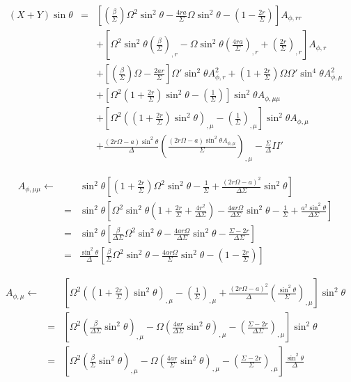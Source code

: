 \documentclass[aps,prd,preprint,groupedaddress]{revtex4-1}
\def\nn{\nonumber}
\def\beqn{\begin{eqnarray}}
\def\eeqn{\end{eqnarray}}
\def\st{\sin\theta}
\def\sst{\sin^2\theta}
\def\Ar{A_{\phi,r}}
\def\Arr{A_{\phi,rr}}
\def\Am{A_{\phi,\mu}}
\def\Amm{A_{\phi,\mu\mu}}
\begin{document}
\beqn
(X+Y)\st
&=&
 \left[\left(\frac{\beta}{\Sigma}\right)\Omega^2\sst
-\frac{4ra}{\Sigma}\Omega\sst
- \left(1-\frac{2r}{\Sigma}\right)\right] \Arr \nn\\
&&
+ \left[  \Omega^2\sst \left(\frac{\beta}{\Sigma}\right)_{,r}
-\Omega\sst\left(\frac{4ra}{\Sigma}\right)_{,r}
+\left(\frac{2r}{\Sigma}\right)_{,r}\right] \Ar \nn\\
&&
+ \left[ \left(\frac{\beta}{\Sigma}\right) \Omega-\frac{2ar}{\Sigma}\right]\Omega'\sst\Ar^2
+ \left(1+\frac{2r}{\Sigma}\right)\Omega\Omega'\sin^4\theta \Am^2\nn\\
&&
+\left[\Omega^2\left(1+\frac{2r}{\Sigma}\right)\sst-\left(\frac{1}{\Sigma}\right) \right]\sst\Amm\nn\\
&&
+\left[ \Omega^2\left( \left(1+\frac{2r}{\Sigma}\right)\sst \right)_{,\mu}-\left(\frac{1}{\Sigma}\right)_{,\mu}\right]\sst\Am\nn\\
&&
+ \frac{(2r\Omega-a)\sst}{\Delta} \left(\frac{(2r\Omega-a)\sst \Am}{\Sigma}\right)_{,\mu}
-\frac{\Sigma}{\Delta}II'
\eeqn

\beqn
\Amm \leftarrow
&&
\sst\left[\left(1+\frac{2r}{\Sigma}\right)\Omega^2 \sst-\frac{1}{\Sigma}
+ \frac{(2r\Omega-a)^2}{\Delta\Sigma}\sst\right] \nn \\
&=&
\sst\left[ \Omega^2\sst \left(1+\frac{2r}{\Sigma}+\frac{4r^2}{\Delta\Sigma}\right)
-\frac{4ar\Omega}{\Delta\Sigma}\sst - \frac{1}{\Sigma} + \frac{a^2\sst}{\Delta\Sigma} \right]\nn \\
&=&
\sst\left[ \frac{\beta}{\Delta\Sigma} \Omega^2\sst -\frac{4ar\Omega}{\Delta\Sigma}\sst -\frac{\Sigma-2r}{\Delta\Sigma}\right]\nn\\
&=&
\frac{\sst}{\Delta}\left[ \frac{\beta}{\Sigma} \Omega^2\sst -\frac{4ar\Omega}{\Sigma}\sst -\left(1-\frac{2r}{\Sigma}\right)\right]
\eeqn

\beqn
\Am \leftarrow
&&
 \left[ \Omega^2\left( \left(1+\frac{2r}{\Sigma}\right)\sst \right)_{,\mu}
-\left(\frac{1}{\Sigma}\right)_{,\mu}
+\frac{(2r\Omega-a)^2}{\Delta} \left(\frac{\sst}{\Sigma}\right)_{,\mu}\right]\sst \nn \\
&=&
\left[ \Omega^2\left( \frac{\beta}{\Delta\Sigma}\sst \right)_{,\mu}
-\Omega\left(\frac{4ar}{\Delta\Sigma}\sst\right)_{,\mu}
-\left(\frac{\Sigma-2r}{\Delta\Sigma}\right)_{,\mu}\right]\sst \nn \\
&=&
\left[ \Omega^2\left( \frac{\beta}{\Sigma}\sst \right)_{,\mu}
-\Omega\left(\frac{4ar}{\Sigma}\sst\right)_{,\mu}
-\left(\frac{\Sigma-2r}{\Sigma}\right)_{,\mu}\right]\frac{\sst}{\Delta} \nn \\
\eeqn
\end{document}
